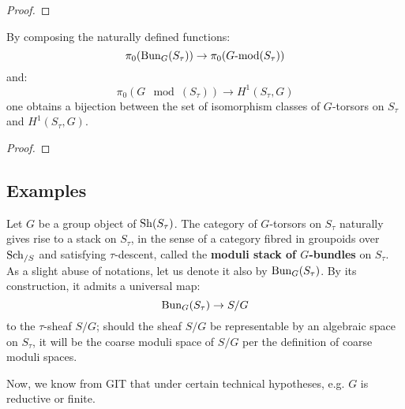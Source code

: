                 \begin{proof}
                    
                \end{proof}
            \begin{theorem}
                By composing the naturally defined functions:
                    $$\pi_0( \mathrm{Bun}_G(S_{\tau}) ) \to \pi_0(G\text{-}\mathrm{mod}(S_{\tau}))$$
                and:
                    $$\pi_0( G\mod(S_{\tau}) ) \to H^1(S_{\tau}, G)$$
                one obtains a bijection between the set of isomorphism classes of $G$-torsors on $S_{\tau}$ and $H^1(S_{\tau}, G)$.
            \end{theorem}
                \begin{proof}
                    
                \end{proof}

        \subsection{Examples}
            \begin{example}
                Let $G$ be a group object of $\mathrm{Sh}(S_{\tau})$. The category of $G$-torsors on $S_{\tau}$ naturally gives rise to a stack on $S_{\tau}$, in the sense of a category fibred in groupoids over $\mathrm{Sch}_{/S}$ and satisfying $\tau$-descent, called the \textbf{moduli stack of $G$-bundles} on $S_{\tau}$. As a slight abuse of notations, let us denote it also by $\mathrm{Bun}_G(S_{\tau})$. By its construction, it admits a universal map:
                    $$\mathrm{Bun}_G(S_{\tau}) \to S/G$$
                to the $\tau$-sheaf $S/G$; should the sheaf $S/G$ be representable by an algebraic space on $S_{\tau}$, it will be the coarse moduli space of $S/G$ per the definition of coarse moduli spaces.

                Now, we know from GIT that under certain technical hypotheses, e.g. $G$ is reductive or finite.
            \end{example}

            \begin{example}
                
            \end{example}

            \begin{example}[Twistings]
                
            \end{example}
    
    \printbibliography

